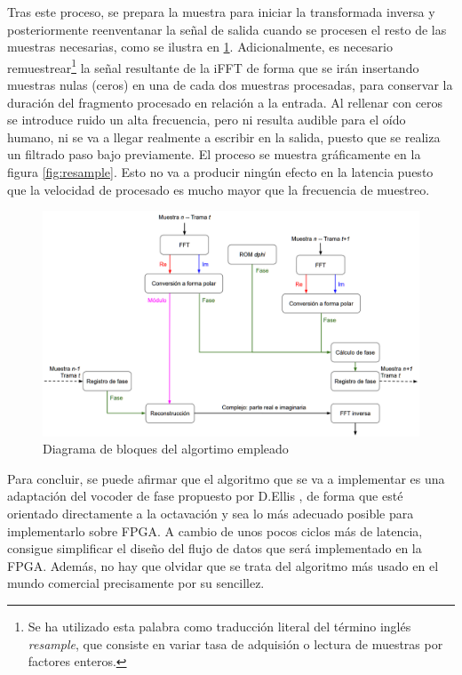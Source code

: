 Tras este proceso, se prepara la muestra para iniciar la transformada inversa y posteriormente reenventanar la señal de salida cuando se procesen el resto de las muestras necesarias, como se ilustra en \ref{fig:esqalgoritmo}. Adicionalmente, es necesario remuestrear\footnote{Se ha utilizado esta palabra como traducción literal del término inglés \emph{resample}, que consiste en variar tasa de adquisión o lectura de muestras por factores enteros.} la señal resultante de la iFFT de forma que se irán insertando muestras nulas (ceros) en una de cada dos muestras procesadas, para conservar la duración del fragmento procesado en relación a la entrada. Al rellenar con ceros se introduce ruido un alta frecuencia, pero ni resulta audible para el oído humano, ni se va a llegar realmente a escribir en la salida, puesto que se realiza un filtrado paso bajo previamente. El proceso se muestra gráficamente en la figura \ref{fig:resample}. Esto no va a producir ningún efecto en la latencia puesto que la velocidad de procesado es mucho mayor que la frecuencia de muestreo.

\begin{figure}[!h]
\begin{center}
\includegraphics[width=15.5cm]{img/esq-alg.png}
\caption{\label{fig:esqalgoritmo}Diagrama de bloques del algortimo empleado}
\end{center}
\end{figure}

Para concluir, se puede afirmar que el algoritmo que se va a implementar es una adaptación del vocoder de fase propuesto por D.Ellis \cite{Ellis}, de forma que esté orientado directamente a la octavación y sea lo más adecuado posible para implementarlo sobre FPGA. A cambio de unos pocos ciclos más de latencia, consigue simplificar el diseño del flujo de datos que será implementado en la FPGA. Además, no hay que olvidar que se trata del algoritmo más usado en el mundo comercial precisamente por su sencillez.

